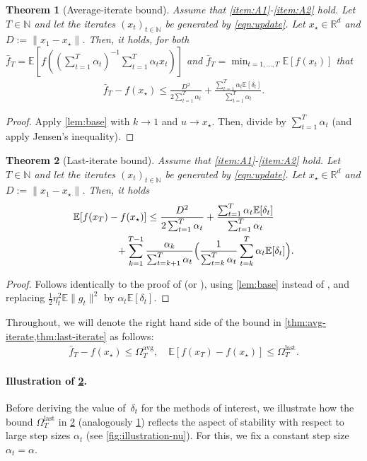 \documentclass{article}
\newcommand{\R}{\mathbb{R}}
\newcommand{\N}{\mathbb{N}}
\newcommand{\E}{\mathbb{E}}
\theoremstyle{plain}
\newtheorem{theorem}{Theorem}[section]
\theoremstyle{definition}
\theoremstyle{remark}
\begin{document}
%
\begin{theorem}[Average-iterate bound]\label{thm:avg-iterate}
    Assume that \ref{item:A1}-\ref{item:A2} hold. Let $T\in \N$ and let the iterates $(x_t)_{t\in \N}$ be generated by \eqref{eqn:update}. Let $x_\star \in \R^d$ and $D:=\|x_1-x_\star\|$.
    Then, it holds, for both $\bar f_T = \E[f((\sum_{t=1}^T \alpha_t)^{-1} \sum_{t=1}^T \alpha_t x_t)]$ and $\bar f_T = \min_{t=1,\ldots,T} \E[f(x_t)]$ that
    \begin{align*}
        \bar f_T - f(x_\star) \leq \frac{D^2}{2\sum_{t=1}^T \alpha_t} + \frac{\sum_{t=1}^T \alpha_t \E[\delta_t]}{\sum_{t=1}^T \alpha_t}.
    \end{align*}
\end{theorem}
%
\begin{proof}
    Apply \cref{lem:base} with $k\to 1$ and $u\to x_\star$. Then, divide by $\sum_{t=1}^T \alpha_t$ (and apply Jensen's inequality).
\end{proof}
%
\begin{theorem}[Last-iterate bound]\label{thm:last-iterate}
    Assume that \ref{item:A1}-\ref{item:A2} hold. Let $T\in \N$ and let the iterates $(x_t)_{t\in \N}$ be generated by \eqref{eqn:update}. Let $x_\star \in \R^d$ and $D:=\|x_1-x_\star\|$. Then, it holds
    \begin{align*}
        &\E[f(x_T) - f(x_\star)] \leq \frac{D^2}{2\sum_{t=1}^T \alpha_t} + \frac{ \sum_{t=1}^T \alpha_t\E[\delta_t]}{\sum_{t=1}^T \alpha_t} \\
        &\hspace{10ex} + \sum_{k=1}^{T-1} \frac{\alpha_k}{\sum_{t=k+1}^{T}\alpha_t} \Big(\frac{1}{\sum_{t=k}^{T}\alpha_t} \sum_{t=k}^T \alpha_t \E[\delta_t]\Big).
    \end{align*}
\end{theorem}
%
\begin{proof}
    Follows identically to the proof of \citet[Thm.\ 10]{Defazio2023a} (or \citet[Thm.\ 3.1]{Schaipp2025}), using \cref{lem:base} instead of \citet[Lem.\ E.1]{Schaipp2025}, and replacing $\frac12 \eta_t^2 \E\|g_t\|^2$ by $\alpha_t \E[\delta_t]$.
\end{proof}
%
Throughout, we will denote the right hand side of the bound in \cref{thm:avg-iterate,thm:last-iterate} as follows:
\begin{align*}
    \bar f_T - f(x_\star) \leq \Omega_T^{\text{avg}}, \quad \E[f(x_T) - f(x_\star)] \leq \Omega_T^{\text{last}}.
\end{align*}
%
\paragraph{Illustration of \cref{thm:last-iterate}.} Before deriving the value of~$\delta_t$ for the methods of interest, we illustrate how the bound $   \Omega_T^{\text{last}}$ in \cref{thm:last-iterate} (analogously \cref{thm:avg-iterate}) reflects the aspect of stability with respect to large step sizes $\alpha_t$ (see \cref{fig:illustration-nu}). For this, we fix a constant step size $\alpha_t = \alpha$. 
\end{document}
